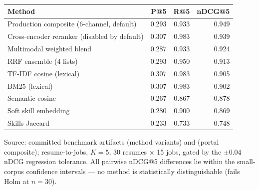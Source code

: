 \caption{Method progression benchmark (canonical committed run, $K{=}5$).}
\label{tab:progression}
\begin{tabular}{@{}lrrr@{}}
\toprule
Method & P@5 & R@5 & nDCG@5 \\
\midrule
Production composite (6-channel, default) & 0.293 & 0.933 & 0.949 \\
Cross-encoder reranker (disabled by default) & 0.307 & 0.983 & 0.939 \\
Multimodal weighted blend & 0.287 & 0.933 & 0.924 \\
RRF ensemble (4 lists) & 0.293 & 0.950 & 0.913 \\
TF-IDF cosine (lexical) & 0.307 & 0.983 & 0.905 \\
BM25 (lexical) & 0.307 & 0.983 & 0.902 \\
Semantic cosine & 0.267 & 0.867 & 0.878 \\
Soft skill embedding & 0.280 & 0.900 & 0.869 \\
Skills Jaccard & 0.233 & 0.733 & 0.748 \\
\bottomrule
\end{tabular}
\par\vspace{0.4em}
\footnotesize{Source: committed benchmark artifacts  (method variants) and  (portal composite); resume-to-jobs, $K{=}5$, 30 resumes $\times$ 15 jobs, gated by the $\pm 0.04$ nDCG regression tolerance. All pairwise nDCG@5 differences lie within the small-corpus confidence intervals --- no method is statistically distinguishable (fails Holm at $n{=}30$).}
